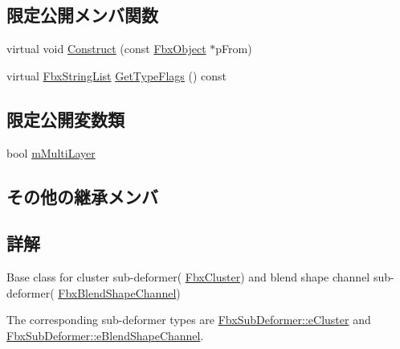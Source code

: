 \subsection*{限定公開メンバ関数}
\begin{DoxyCompactItemize}
\item 
virtual void \hyperlink{class_fbx_sub_deformer_ae3d566383651e82b681827f0f38b97f3}{Construct} (const \hyperlink{class_fbx_object}{Fbx\+Object} $\ast$p\+From)
\item 
virtual \hyperlink{class_fbx_string_list}{Fbx\+String\+List} \hyperlink{class_fbx_sub_deformer_a80652fd0521b2ea1897e221e5ae1b5cf}{Get\+Type\+Flags} () const
\end{DoxyCompactItemize}
\subsection*{限定公開変数類}
\begin{DoxyCompactItemize}
\item 
bool \hyperlink{class_fbx_sub_deformer_aedda8831e40648602b073c9613687e9d}{m\+Multi\+Layer}
\end{DoxyCompactItemize}
\subsection*{その他の継承メンバ}


\subsection{詳解}
Base class for cluster sub-\/deformer( \hyperlink{class_fbx_cluster}{Fbx\+Cluster}) and blend shape channel sub-\/deformer( \hyperlink{class_fbx_blend_shape_channel}{Fbx\+Blend\+Shape\+Channel})

The corresponding sub-\/deformer types are \hyperlink{class_fbx_sub_deformer_aed7eba8aabbb8b25a8ddbab127d67319a329357c41a658df236d0802d586c2643}{Fbx\+Sub\+Deformer\+::e\+Cluster} and \hyperlink{class_fbx_sub_deformer_aed7eba8aabbb8b25a8ddbab127d67319a1082bcdf5d88e593ea78a8da89b5cebd}{Fbx\+Sub\+Deformer\+::e\+Blend\+Shape\+Channel}.

